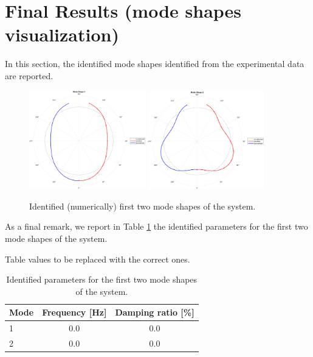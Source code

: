 \section{Final Results (mode shapes visualization)}
\label{sec:final_results}

In this section, the identified mode shapes identified from the experimental data are reported.

\begin{figure}[H]
    \centering
    \includegraphics[width=0.45\textwidth]{img/MATLAB/Part_B/ModeShape_01.png}
    \hfill
    \includegraphics[width=0.45\textwidth]{img/MATLAB/Part_B/ModeShape_02.png}
    \caption{Identified (numerically) first two mode shapes of the system.}
    \label{fig:mode_shapes}
\end{figure}

As a final remark, we report in Table \ref{tab:mode_shapes_parameters} the identified parameters for the first two mode shapes of the system.

\begin{center}
    \huge{Table values to be replaced with the correct ones.}
\end{center}

\begin{table}[H]
    \centering
    \begin{tabular}{lcc}
        \hline
        Mode & Frequency [Hz] & Damping ratio [\%] \\
        \hline
        1    & 0.0            & 0.0                \\
        2    & 0.0            & 0.0                \\
        \hline
    \end{tabular}
    \caption{Identified parameters for the first two mode shapes of the system.}
    \label{tab:mode_shapes_parameters}
\end{table}

